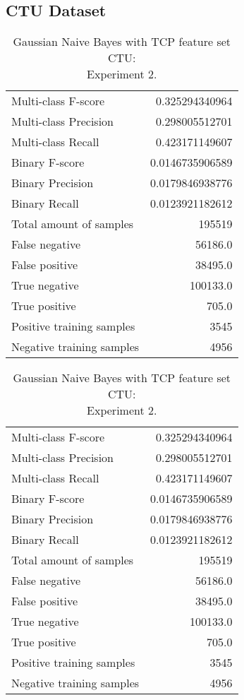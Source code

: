 \subsection{CTU Dataset}

\begin{table}[H]
\begin{minipage}{0.5\textwidth}
\caption{Gaussian Naive Bayes with TCP feature set CTU: \\Experiment 1.}
\centering
\begin{tabular}{l r}
\toprule
Multi-class F-score & 0.325294340964 \\
Multi-class Precision & 0.298005512701 \\
Multi-class Recall & 0.423171149607 \\
\midrule
Binary F-score & 0.0146735906589 \\
Binary Precision & 0.0179846938776 \\
Binary Recall & 0.0123921182612 \\
\midrule
Total amount of samples & 195519 \\
False negative & 56186.0 \\
False positive & 38495.0 \\
True negative & 100133.0 \\
True positive & 705.0 \\
\midrule
Positive training samples & 3545 \\
Negative training samples & 4956 \\
\bottomrule
\end{tabular}
\end{minipage}
\hfillx
\begin{minipage}{0.5\textwidth}
\caption{Gaussian Naive Bayes with TCP feature set CTU: \\Experiment 2.}
\centering
\begin{tabular}{l r}
\toprule
Multi-class F-score & 0.325294340964 \\
Multi-class Precision & 0.298005512701 \\
Multi-class Recall & 0.423171149607 \\
\midrule
Binary F-score & 0.0146735906589 \\
Binary Precision & 0.0179846938776 \\
Binary Recall & 0.0123921182612 \\
\midrule
Total amount of samples & 195519 \\
False negative & 56186.0 \\
False positive & 38495.0 \\
True negative & 100133.0 \\
True positive & 705.0 \\
\midrule
Positive training samples & 3545 \\
Negative training samples & 4956 \\
\bottomrule
\end{tabular}
\end{minipage}
\end{table}
